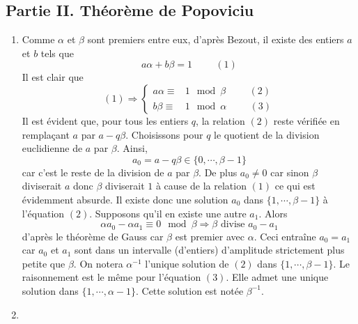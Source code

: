 \subsection*{Partie II. Théorème de Popoviciu}
\begin{enumerate}
 \item Comme $\alpha$ et $\beta$ sont premiers entre eux, d'après Bezout, il existe des entiers $a$ et $b$ tels que
\begin{displaymath}
 a\alpha + b\beta =1 \hspace{1cm}(1)
\end{displaymath}
Il est clair que 
\begin{displaymath}
 (1)\Rightarrow \left\lbrace 
\begin{aligned}
 a\alpha\equiv& 1 \mod{\beta} \hspace{1cm}(2)\\
 b\beta \equiv& 1 \mod{\alpha} \hspace{1cm}(3)
\end{aligned}
\right. 
\end{displaymath}
Il est évident que, pour tous les entiers $q$, la relation $(2)$ reste vérifiée en remplaçant $a$ par $a- q\beta$. Choisissons pour $q$ le quotient de la division euclidienne de $a$ par $\beta$. Ainsi,
\begin{displaymath}
 a_0=a- q\beta \in \{0,\cdots,\beta -1\}
\end{displaymath}
car c'est le reste de la division de $a$ par $\beta$. De plus $a_0\neq 0$ car sinon $\beta$ diviserait $a$ donc $\beta$ diviserait $1$ à cause de la relation $(1)$ ce qui est évidemment absurde. Il existe donc une solution $a_0$ dans $\{1,\cdots,\beta -1\}$ à l'équation $(2)$.\newline
Supposons qu'il en existe une autre $a_1$. Alors 
\begin{displaymath}
 \alpha a_0 - \alpha a_1 \equiv 0 \mod{\beta}\Rightarrow \beta \text{ divise } a_0-a_1
\end{displaymath}
d'après le théorème de Gauss car $\beta$ est premier avec $\alpha$. Ceci entraîne $a_0=a_1$ car $a_0$ et $a_1$ sont dans un intervalle (d'entiers) d'amplitude strictement plus petite que $\beta$.\newline
On notera $\alpha^{-1}$ l'unique solution de $(2)$ dans $\{1,\cdots,\beta -1\}$. Le raisonnement est le même pour l'équation $(3)$. Elle admet une unique solution dans $\{1,\cdots,\alpha -1\}$. Cette solution est notée $\beta^{-1}$. 
\item \begin{enumerate}

\end{enumerate}
\end{enumerate}
